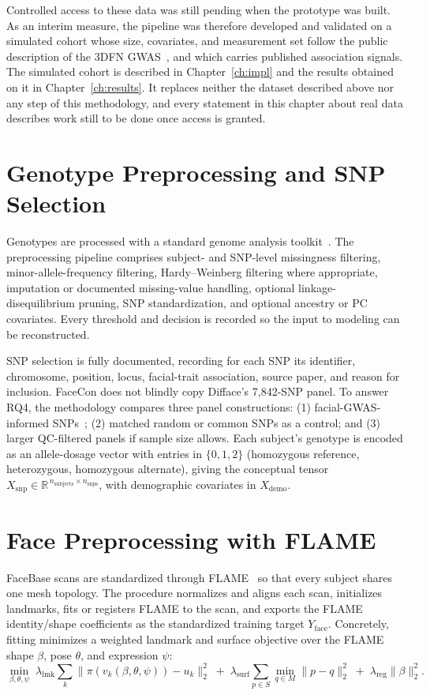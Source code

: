 Controlled access to these data was still pending when the prototype was built. As an interim measure, the pipeline was therefore developed and validated on a simulated cohort whose size, covariates, and measurement set follow the public description of the 3DFN GWAS~\cite{ref:shaffer,ref:weinberg}, and which carries published association signals. The simulated cohort is described in Chapter~\ref{ch:impl} and the results obtained on it in Chapter~\ref{ch:results}. It replaces neither the dataset described above nor any step of this methodology, and every statement in this chapter about real data describes work still to be done once access is granted.

\section{Genotype Preprocessing and SNP Selection}
Genotypes are processed with a standard genome analysis toolkit~\cite{ref:plink}. The preprocessing pipeline comprises subject- and SNP-level missingness filtering, minor-allele-frequency filtering, Hardy--Weinberg filtering where appropriate, imputation or documented missing-value handling, optional linkage-disequilibrium pruning, SNP standardization, and optional ancestry or PC covariates. Every threshold and decision is recorded so the input to modeling can be reconstructed.

SNP selection is fully documented, recording for each SNP its identifier, chromosome, position, locus, facial-trait association, source paper, and reason for inclusion. FaceCon does not blindly copy Difface's 7,842-SNP panel. To answer RQ4, the methodology compares three panel constructions: (1) facial-GWAS-informed SNPs~\cite{ref:white,ref:xiong,ref:claes}; (2) matched random or common SNPs as a control; and (3) larger QC-filtered panels if sample size allows. Each subject's genotype is encoded as an allele-dosage vector with entries in $\{0,1,2\}$ (homozygous reference, heterozygous, homozygous alternate), giving the conceptual tensor $X_{\mathrm{snp}} \in \mathbb{R}^{\,n_{\mathrm{subjects}} \times n_{\mathrm{snps}}}$, with demographic covariates in $X_{\mathrm{demo}}$.

\section{Face Preprocessing with FLAME}
FaceBase scans are standardized through FLAME~\cite{ref:flame} so that every subject shares one mesh topology. The procedure normalizes and aligns each scan, initializes landmarks, fits or registers FLAME to the scan, and exports the FLAME identity/shape coefficients as the standardized training target $Y_{\mathrm{face}}$. Concretely, fitting minimizes a weighted landmark and surface objective over the FLAME shape $\beta$, pose $\theta$, and expression $\psi$:
\begin{equation}\label{eq:fit}
\min_{\beta,\theta,\psi}\; \lambda_{\mathrm{lmk}}\!\sum_{k}\lVert \pi(v_k(\beta,\theta,\psi)) - u_k\rVert_2^2 \;+\; \lambda_{\mathrm{surf}}\!\sum_{p\in S}\min_{q\in M}\lVert p-q\rVert_2^2 \;+\; \lambda_{\mathrm{reg}}\lVert\beta\rVert_2^2 .
\end{equation}

